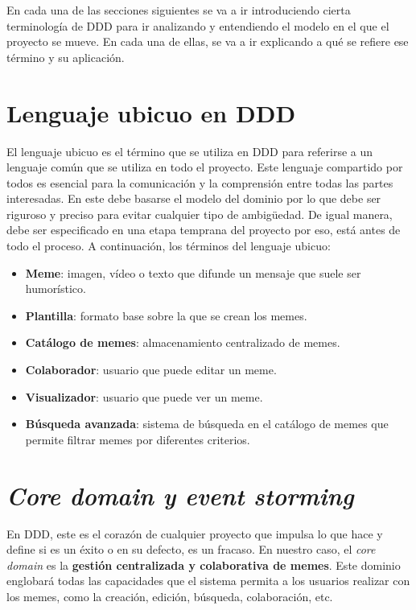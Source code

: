 En cada una de las secciones siguientes se va a ir introduciendo cierta terminología de DDD para ir analizando y entendiendo el modelo en el que el proyecto se mueve. En cada una de ellas, se va a ir explicando a qué se refiere ese término y su aplicación.

\section{Lenguaje ubicuo en DDD}

El lenguaje ubicuo es el término que se utiliza en DDD para referirse a un lenguaje común que se utiliza en todo el proyecto. Este lenguaje compartido por todos es esencial para la comunicación y la comprensión entre todas las partes interesadas. En este debe basarse el modelo del dominio por lo que debe ser riguroso y preciso para evitar cualquier tipo de ambigüedad. De igual manera, debe ser especificado en una etapa temprana del proyecto por eso, está antes de todo el proceso. A continuación, los términos del lenguaje ubicuo:

\begin{itemize}
    \item \textbf{Meme}: imagen, vídeo o texto que difunde un mensaje que suele ser humorístico.
    \item \textbf{Plantilla}: formato base sobre la que se crean los memes.
    \item \textbf{Catálogo de memes}: almacenamiento centralizado de memes.
    \item \textbf{Colaborador}: usuario que puede editar un meme.
    \item \textbf{Visualizador}: usuario que puede ver un meme.
    \item \textbf{Búsqueda avanzada}: sistema de búsqueda en el catálogo de memes que permite filtrar memes por diferentes criterios.
\end{itemize}

\section{\textit{Core domain y event storming}}

En DDD, este es el corazón de cualquier proyecto que impulsa lo que hace y define si es un éxito o en su defecto, es un fracaso. En nuestro caso, el \textit{core domain} es la \textbf{gestión centralizada y colaborativa de memes}. Este dominio englobará todas las capacidades que el sistema permita a los usuarios realizar con los memes, como la creación, edición, búsqueda, colaboración, etc.

